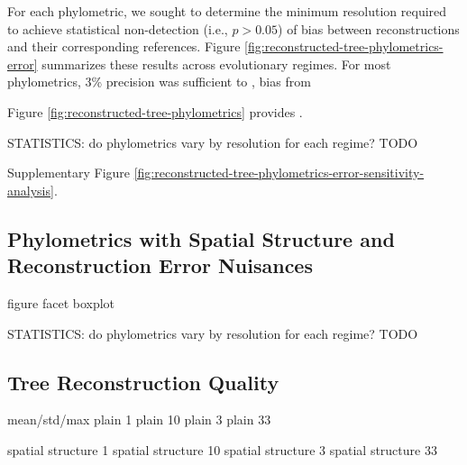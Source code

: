 

For each phylometric, we sought to determine the minimum resolution required to achieve statistical non-detection (i.e., $p > 0.05$) of bias between reconstructions and their corresponding references. Figure \ref{fig:reconstructed-tree-phylometrics-error} summarizes these results across evolutionary regimes. For most phylometrics, 3\% precision was sufficient to , bias from 



Figure \ref{fig:reconstructed-tree-phylometrics} provides .

STATISTICS: do phylometrics vary by resolution for each regime?
TODO



Supplementary Figure \ref{fig:reconstructed-tree-phylometrics-error-sensitivity-analysis}.

\subsection{Phylometrics with Spatial Structure and Reconstruction Error Nuisances}

figure facet boxplot


STATISTICS: do phylometrics vary by resolution for each regime?
TODO




\subsection{Tree Reconstruction Quality}



mean/std/max
plain	1%
plain	10%
plain	3%
plain	33%


spatial structure	1%
spatial structure	10%
spatial structure	3%
spatial structure	33%

